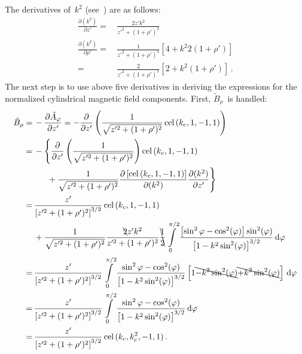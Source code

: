 The derivatives of~$k^2$ (see~) are as follows:
\begin{align}
      \frac{\partial (k^2)}{\partial z'}
 =&\, \frac{2 z' k^2}{z'^2 + (1 + \rho')^2} \\
      \frac{\partial (k^2)}{\partial \rho'}
 =&\, \frac{1}{z'^2 + (1 + \rho')^2} \left[ 4 + k^2 2 (1 + \rho') \right] \\
 =&\, \frac{2}{z'^2 + (1 + \rho')^2} \left[ 2 + k^2 (1 + \rho') \right] \, .
\end{align}
The next step is to use above five derivatives in deriving the expressions
for the normalized cylindrical magnetic field components.
First, $\tilde{B}_\rho$~is handled:
\begin{align}
      \tilde{B}_\rho
 =&\, - \frac{\partial \tilde{A}_\varphi}{\partial z'}
 =    - \frac{\partial}{\partial z'} \left( \frac{1}{\sqrt{z'^2 + (1 + \rho')^2}} \,\textrm{cel}\,(k_c, 1, -1, 1) \right) \nonumber \\
 =&\,          -\Biggl\{    \frac{\partial}{\partial z'} \left( \frac{1}{\sqrt{z'^2 + (1 + \rho')^2}} \right) \textrm{cel}\,(k_c, 1, -1, 1) \nonumber \\
 ~&\, \phantom{-\Biggl\{} + \frac{1}{\sqrt{z'^2 + (1 + \rho')^2}} \frac{\partial \left[\textrm{cel}\,(k_c, 1, -1, 1)\right]}{\partial(k^2)} \frac{\partial (k^2)}{\partial z'} \Biggr\} \nonumber \\
 =&\,   \frac{z'}{\left[ z'^2 + (1 + \rho')^2 \right]^{3/2}} \,\textrm{cel}\,(k_c, 1, -1, 1) \nonumber \\
 ~&\, + \frac{1}{\sqrt{z'^2 + (1 + \rho')^2}} \frac{\bcancel{2} z' k^2}{z'^2 + (1 + \rho')^2}
        \bcancel{\frac{1}{2}} \int\limits_0^{\pi/2} \frac{\left[\sin^2{\varphi} - \cos^2(\varphi)\right]\sin^2(\varphi)}{\left[1 - k^2 \sin^2(\varphi)\right]^{3/2}} \,\mathrm{d}\varphi \nonumber \\
 =&\, \frac{z'}{\left[ z'^2 + (1 + \rho')^2 \right]^{3/2}}
      \int\limits_0^{\pi/2}
        \frac{\sin^2{\varphi} - \cos^2(\varphi)}{\left[1 - k^2 \sin^2(\varphi)\right]^{3/2}}
        \left[ 1 \bcancel{-k^2\sin^2(\varphi)} \bcancel{+k^2\sin^2(\varphi)} \right] \,\mathrm{d}\varphi \nonumber \\
 =&\, \frac{z'}{\left[ z'^2 + (1 + \rho')^2 \right]^{3/2}}
      \int\limits_0^{\pi/2} \frac{\sin^2{\varphi} - \cos^2(\varphi)}{\left[1 - k^2 \sin^2(\varphi)\right]^{3/2}} \,\mathrm{d}\varphi \nonumber \\
 =&\, \frac{z'}{\left[ z'^2 + (1 + \rho')^2 \right]^{3/2}} \,\textrm{cel}\,(k_c, k_c^2, -1, 1) \, .
\end{align}
